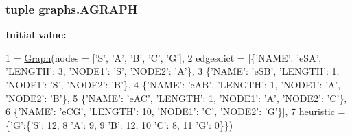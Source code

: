 \subsubsection[{A\+G\+R\+A\+P\+H}]{\setlength{\rightskip}{0pt plus 5cm}tuple graphs.\+A\+G\+R\+A\+P\+H}\label{namespacegraphs_a427450b6287d6cb549b6243dee6d4253}
{\bfseries Initial value\+:}
\begin{DoxyCode}
1 = \hyperlink{classsearch_1_1_graph}{Graph}(nodes = [\textcolor{stringliteral}{'S'}, \textcolor{stringliteral}{'A'}, \textcolor{stringliteral}{'B'}, \textcolor{stringliteral}{'C'}, \textcolor{stringliteral}{'G'}],
2                edgesdict = [\{\textcolor{stringliteral}{'NAME'}: \textcolor{stringliteral}{'eSA'}, \textcolor{stringliteral}{'LENGTH'}: 3, \textcolor{stringliteral}{'NODE1'}: \textcolor{stringliteral}{'S'}, \textcolor{stringliteral}{'NODE2'}: \textcolor{stringliteral}{'A'}\},
3                             \{\textcolor{stringliteral}{'NAME'}: \textcolor{stringliteral}{'eSB'}, \textcolor{stringliteral}{'LENGTH'}: 1, \textcolor{stringliteral}{'NODE1'}: \textcolor{stringliteral}{'S'}, \textcolor{stringliteral}{'NODE2'}: \textcolor{stringliteral}{'B'}\},
4                             \{\textcolor{stringliteral}{'NAME'}: \textcolor{stringliteral}{'eAB'}, \textcolor{stringliteral}{'LENGTH'}: 1, \textcolor{stringliteral}{'NODE1'}: \textcolor{stringliteral}{'A'}, \textcolor{stringliteral}{'NODE2'}: \textcolor{stringliteral}{'B'}\},
5                             \{\textcolor{stringliteral}{'NAME'}: \textcolor{stringliteral}{'eAC'}, \textcolor{stringliteral}{'LENGTH'}: 1, \textcolor{stringliteral}{'NODE1'}: \textcolor{stringliteral}{'A'}, \textcolor{stringliteral}{'NODE2'}: \textcolor{stringliteral}{'C'}\},
6                             \{\textcolor{stringliteral}{'NAME'}: \textcolor{stringliteral}{'eCG'}, \textcolor{stringliteral}{'LENGTH'}: 10, \textcolor{stringliteral}{'NODE1'}: \textcolor{stringliteral}{'C'}, \textcolor{stringliteral}{'NODE2'}: \textcolor{stringliteral}{'G'}\}],
7                heuristic = \{\textcolor{stringliteral}{'G'}:\{\textcolor{stringliteral}{'S'}: 12,
8                                  \textcolor{stringliteral}{'A'}: 9,
9                                  \textcolor{stringliteral}{'B'}: 12,
10                                  \textcolor{stringliteral}{'C'}: 8,
11                                  \textcolor{stringliteral}{'G'}: 0\}\})
\end{DoxyCode}
\hypertarget{namespacegraphs_a19f04d81ba0467a7f69415bcf71409db}{}

